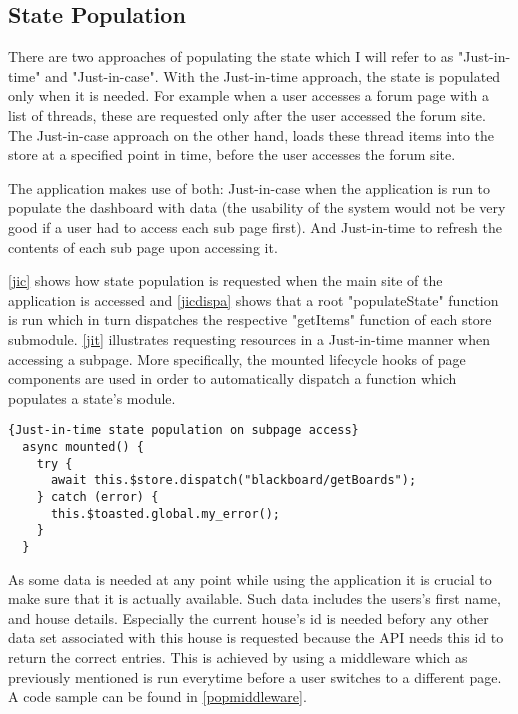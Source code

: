 \subsection{State Population} \label{statepopulation}
There are two approaches of populating the state which I will refer to as "Just-in-time" and "Just-in-case". With the Just-in-time approach, the state is populated only when it is needed. For example when a user accesses a forum page with a list of threads, these are requested only after the user accessed the forum site. The Just-in-case approach on the other hand, loads these thread items into the store at a specified point in time, before the user accesses the forum site. 

The application makes use of both: Just-in-case when the application is run to populate the dashboard with data (the usability of the system would not be very good if a user had to access each sub page first). And Just-in-time to refresh the contents of each sub page upon accessing it.

\autoref{jic} shows how state population is requested when the main site of the application is accessed and \autoref{jicdispa} shows that a root "populateState" function is run which in turn dispatches the respective "getItems" function of each store submodule. \autoref{jit} illustrates requesting resources in a Just-in-time manner when accessing a subpage. More specifically, the mounted lifecycle hooks of page components are used in order to automatically dispatch a function which populates a state's module. \newline

\begin{lstlisting}[caption=Just-in-time state population on subpage access, captionpos=b, style=htmlcssjs, label=jit]{Just-in-time state population on subpage access}
  async mounted() {
    try {
      await this.$store.dispatch("blackboard/getBoards");
    } catch (error) {
      this.$toasted.global.my_error();
    }
  }
\end{lstlisting}

As some data is needed at any point while using the application it is crucial to make sure that it is actually available. Such data includes the users's first name, and house details. Especially the current house's id is needed befory any other data set associated with this house is requested because the API needs this id to return the correct entries. This is achieved by using a middleware which as previously mentioned is run everytime before a user switches to a different page. A code sample can be found in \autoref{popmiddleware}.

